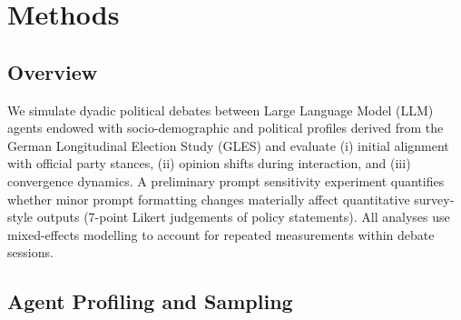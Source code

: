 

\chapter{Methods}
\label{chap:methods} 


\section{Overview}
We simulate dyadic political debates between Large Language Model (LLM) agents endowed with socio-demographic and political profiles derived from the German Longitudinal Election Study (GLES) and evaluate (i) initial alignment with official party stances, (ii) opinion shifts during interaction, and (iii) convergence dynamics. A preliminary prompt sensitivity experiment quantifies whether minor prompt formatting changes materially affect quantitative survey-style outputs (7-point Likert judgements of policy statements). All analyses use mixed-effects modelling to account for repeated measurements within debate sessions.

\section{Agent Profiling and Sampling}
\label{sec:agent_profiling_and_sampling}

